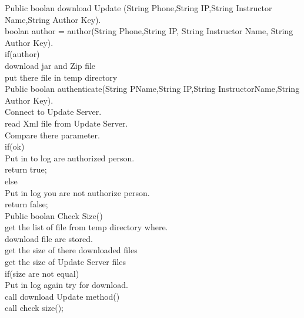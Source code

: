 \documentclass{article}
\begin{document}
           Public boolan download Update (String Phone,String IP,String Instructor Name,String Author Key).\\
          {
          boolan author = author(String Phone,String IP, String Instructor Name, String Author Key).\\
          if(author)\\
          {
                                         download jar and Zip file\\
                                         put there file in temp directory\\
       }
     }
         Public boolan authenticate(String PName,String IP,String InstructorName,String Author Key).\\
    {
                                        Connect to Update Server.\\ 
                                        read Xml file from Update Server.\\
                                        Compare there  parameter.\\
                                        if(ok) \\
                                        Put in to log are authorized person.\\
                                        return true;\\
                                        else\\
                                        Put in log you are not authorize person.\\
                                        return false;\\
                                        }
                                        Public boolan Check Size()\\
                                        {
                                        get the list of file from temp directory where.\\
                                        download file are stored.\\
                                        get the size of there downloaded files\\
                                        get the size of Update Server files\\
                                        if(size are not equal)\\
                                       {
                                       Put in log again try for download.\\
                                       call download Update method()\\
                                       call check size();\\    
                                       }
                                      }
\end{document}
